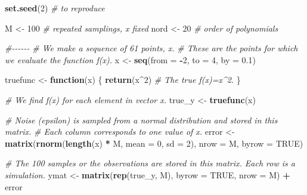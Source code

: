 \documentclass[
]{article}
\newenvironment{Shaded}{\begin{snugshade}}{\end{snugshade}}
\newcommand{\AttributeTok}[1]{\textcolor[rgb]{0.13,0.29,0.53}{#1}}
\newcommand{\CommentTok}[1]{\textcolor[rgb]{0.56,0.35,0.01}{\textit{#1}}}
\newcommand{\ConstantTok}[1]{\textcolor[rgb]{0.56,0.35,0.01}{#1}}
\newcommand{\ControlFlowTok}[1]{\textcolor[rgb]{0.13,0.29,0.53}{\textbf{#1}}}
\newcommand{\DecValTok}[1]{\textcolor[rgb]{0.00,0.00,0.81}{#1}}
\newcommand{\FloatTok}[1]{\textcolor[rgb]{0.00,0.00,0.81}{#1}}
\newcommand{\FunctionTok}[1]{\textcolor[rgb]{0.13,0.29,0.53}{\textbf{#1}}}
\newcommand{\NormalTok}[1]{#1}
\newcommand{\OtherTok}[1]{\textcolor[rgb]{0.56,0.35,0.01}{#1}}
\newcommand{\SpecialCharTok}[1]{\textcolor[rgb]{0.81,0.36,0.00}{\textbf{#1}}}
\begin{document}
\begin{Shaded}
\begin{Highlighting}[]
\FunctionTok{set.seed}\NormalTok{(}\DecValTok{2}\NormalTok{) }\CommentTok{\# to reproduce}

\NormalTok{M }\OtherTok{\textless{}{-}} \DecValTok{100} \CommentTok{\# repeated samplings, x fixed}
\NormalTok{nord }\OtherTok{\textless{}{-}} \DecValTok{20} \CommentTok{\# order of polynomials}

\CommentTok{\#{-}{-}{-}{-}{-}{-}}
\CommentTok{\# We make a sequence of 61 points, x.}
\CommentTok{\# These are the points for which we evaluate the function f(x).}
\NormalTok{x }\OtherTok{\textless{}{-}} \FunctionTok{seq}\NormalTok{(}\AttributeTok{from =} \SpecialCharTok{{-}}\DecValTok{2}\NormalTok{, }\AttributeTok{to =} \DecValTok{4}\NormalTok{, }\AttributeTok{by =} \FloatTok{0.1}\NormalTok{) }

\NormalTok{truefunc }\OtherTok{\textless{}{-}} \ControlFlowTok{function}\NormalTok{(x) \{}
  \FunctionTok{return}\NormalTok{(x}\SpecialCharTok{\^{}}\DecValTok{2}\NormalTok{) }\CommentTok{\# The true f(x)=x\^{}2. }
\NormalTok{\}}

\CommentTok{\# We find f(x) for each element in vector x.}
\NormalTok{true\_y }\OtherTok{\textless{}{-}} \FunctionTok{truefunc}\NormalTok{(x) }

\CommentTok{\# Noise (epsilon) is sampled from a normal distribution and stored in this matrix.}
\CommentTok{\# Each column corresponds to one value of x.}
\NormalTok{error }\OtherTok{\textless{}{-}} \FunctionTok{matrix}\NormalTok{(}\FunctionTok{rnorm}\NormalTok{(}\FunctionTok{length}\NormalTok{(x) }\SpecialCharTok{*}\NormalTok{ M, }\AttributeTok{mean =} \DecValTok{0}\NormalTok{, }\AttributeTok{sd =} \DecValTok{2}\NormalTok{),}
                \AttributeTok{nrow =}\NormalTok{ M,}
                \AttributeTok{byrow =} \ConstantTok{TRUE}\NormalTok{) }

\CommentTok{\# The 100 samples or the observations are stored in this matrix. Each row is a simulation.}
\NormalTok{ymat }\OtherTok{\textless{}{-}} \FunctionTok{matrix}\NormalTok{(}\FunctionTok{rep}\NormalTok{(true\_y, M), }\AttributeTok{byrow =} \ConstantTok{TRUE}\NormalTok{, }\AttributeTok{nrow =}\NormalTok{ M) }\SpecialCharTok{+}\NormalTok{ error}


\end{Highlighting}
\end{Shaded}
\end{document}
